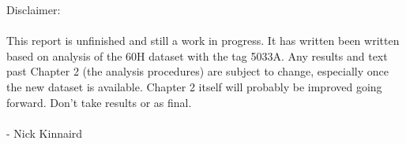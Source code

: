 \clearpage

Disclaimer: \\ \\ 

This report is unfinished and still a work in progress. It has written been written based on analysis of the 60H dataset with the tag 5033A. Any results and text past Chapter 2 (the analysis procedures) are subject to change, especially once the new dataset is available. Chapter 2 itself will probably be improved going forward. Don't take results or as final. \\ \\

- Nick Kinnaird

\clearpage
